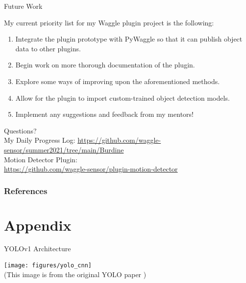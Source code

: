 \documentclass[10pt]{beamer}
\begin{document}
\begin{frame}{Future Work}


My current priority list for my Waggle plugin project is the following:

\begin{enumerate}
\item Integrate the plugin prototype with PyWaggle so that it can publish object data to other plugins.

\item Begin work on more thorough documentation of the plugin.

\item Explore some ways of improving upon the aforementioned methods.

\item Allow for the plugin to import custom-trained object detection models.

\item Implement any suggestions and feedback from my mentors!
\end{enumerate}

\end{frame}

{
\begin{frame}[standout]
  Questions?\\[10mm]
  \small{
  My Daily Progress Log:
  \href{https://github.com/waggle-sensor/summer2021/tree/main/Burdine}{https://github.com/waggle-sensor/summer2021/tree/main/Burdine}\\[6mm]
  Motion Detector Plugin:\\[2mm]
  \href{https://github.com/waggle-sensor/plugin-motion-detector}{https://github.com/waggle-sensor/plugin-motion-detector}}
\end{frame}
}

\begin{frame}[allowframebreaks]
\frametitle{References}


\end{frame}

\appendix

\section{Appendix}

\begin{frame}{YOLOv1 Architecture}
\begin{center}
\texttt{[image: figures/yolo\_cnn]}\\
(This image is from the original YOLO paper \cite{YOLO})
\end{center}
\end{frame}
\end{document}
